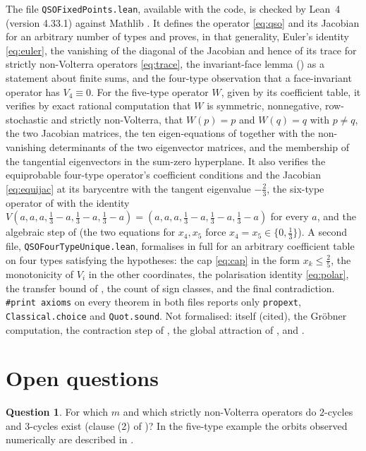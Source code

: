 \documentclass[11pt]{amsart}
\theoremstyle{definition}
\newtheorem{question}[theorem]{Question}
\begin{document}
The file \texttt{QSOFixedPoints.lean}, available with the code, is checked by Lean~4 \cite{Lean4} (version 4.33.1) against Mathlib \cite{Mathlib}. It defines the operator \eqref{eq:qso} and its Jacobian for an arbitrary number of types and proves, in that generality, Euler's identity \eqref{eq:euler}, the vanishing of the diagonal of the Jacobian and hence of its trace for strictly non-Volterra operators \eqref{eq:trace}, the invariant-face lemma () as a statement about finite sums, and the four-type observation that a face-invariant operator has $V_4\equiv0$. For the five-type operator $W$, given by its coefficient table, it verifies by exact rational computation that $W$ is symmetric, nonnegative, row-stochastic and strictly non-Volterra, that $W(p)=p$ and $W(q)=q$ with $p\ne q$, the two Jacobian matrices, the ten eigen-equations of  together with the non-vanishing determinants of the two eigenvector matrices, and the membership of the tangential eigenvectors in the sum-zero hyperplane. It also verifies the equiprobable four-type operator's coefficient conditions and the Jacobian \eqref{eq:equijac} at its barycentre with the tangent eigenvalue $-\frac23$, the six-type operator of  with the identity $V(a,a,a,\frac13-a,\frac13-a,\frac13-a)=(a,a,a,\frac13-a,\frac13-a,\frac13-a)$ for every $a$, and the algebraic step of  (the two equations for $x_4,x_5$ force $x_4=x_5\in\{0,\frac13\}$). A second file, \texttt{QSOFourTypeUnique.lean}, formalises  in full for an arbitrary coefficient table on four types satisfying the hypotheses: the cap \eqref{eq:cap} in the form $x_k\le\frac25$, the monotonicity of $V_i$ in the other coordinates, the polarisation identity \eqref{eq:polar}, the transfer bound of , the count of sign classes, and the final contradiction. \texttt{\#print axioms} on every theorem in both files reports only \texttt{propext}, \texttt{Classical.choice} and \texttt{Quot.sound}. Not formalised:  itself (cited), the Gr\"obner computation, the contraction step of , the global attraction of , and .

\section{Open questions}

\begin{question}
For which $m$ and which strictly non-Volterra operators do $2$-cycles and $3$-cycles exist (clause (2) of )? In the five-type example the orbits observed numerically are described in .
\end{question}
\end{document}
